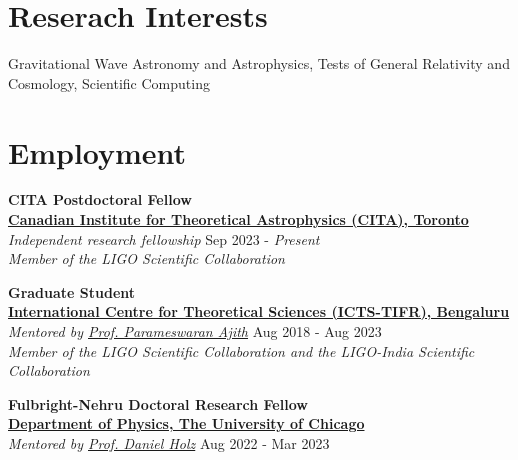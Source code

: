 \documentclass[11pt, margin, centered, letterpaper]{res}
\begin{document}
\begin{resume}

\section{Reserach Interests}
Gravitational Wave Astronomy and Astrophysics, Tests of General Relativity and Cosmology, Scientific Computing 
\\

\section{Employment}
\textbf{CITA Postdoctoral Fellow}
\\
\textbf{\href{https://www.icts.res.in/}{Canadian Institute for Theoretical Astrophysics (CITA), Toronto}}\\
\emph{Independent research fellowship} \hfill Sep 2023 - \textit{Present}\\
\textit{Member of the LIGO Scientific Collaboration}

\textbf{Graduate Student}
\\
\textbf{\href{https://www.icts.res.in/}{International Centre for Theoretical Sciences (ICTS-TIFR), Bengaluru}}\\
\emph{Mentored by \href{https://home.icts.res.in/~ajith/Home.html}{Prof. Parameswaran Ajith}} \hfill Aug 2018 - Aug 2023\\
\textit{Member of the LIGO Scientific Collaboration and the LIGO-India Scientific Collaboration}

\textbf{Fulbright-Nehru Doctoral Research Fellow}
\\
\textbf{\href{https://www.icts.res.in/}{Department of Physics, The University of Chicago}}\\
\emph{Mentored by \href{https://home.icts.res.in/~ajith/Home.html}{Prof. Daniel Holz}} \hfill Aug 2022 - Mar 2023


\begin{comment}



\end{comment}
\end{resume}
\end{document}

